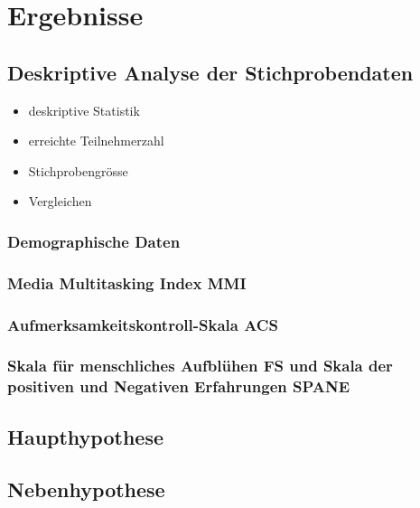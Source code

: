 %
%
\let\raggedsection\centering 
\chapter{Ergebnisse}
\let\raggedsection\raggedright 
\glsresetall
\section{Deskriptive Analyse der Stichprobendaten}
\label{label.stichprobe}
\begin{itemize}
      \item deskriptive Statistik
      \item erreichte Teilnehmerzahl
      \item Stichprobengrösse
      \item Vergleichen 
\end{itemize}
\subsection{Demographische Daten}
\subsection{Media Multitasking Index MMI}
\subsection{Aufmerksamkeitskontroll-Skala ACS}
\subsection{Skala für menschliches Aufblühen FS und Skala der positiven und Negativen Erfahrungen SPANE}


\section{Haupthypothese}\label{label.haupthypothese}
\section{Nebenhypothese}\label{label.nebenhypothese}


